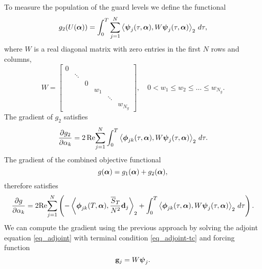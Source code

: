 \documentclass[11pt]{article}
\begin{document}
To measure the population of the guard levels we define the functional
\begin{equation}
  g_2(U(\boldsymbol{\alpha})) =\int_0^T \sum_{j=1}^N \left\langle \boldsymbol{\psi}_j(\tau,\boldsymbol{\alpha}), W\boldsymbol{\psi}_j(\tau,\boldsymbol{\alpha})
  \right\rangle_2\, d\tau,
\end{equation}
where $W$ is a real diagonal matrix with zero entries in the first $N$ rows and columns,
\[
W = \begin{bmatrix}
  0 &&&&& \\
  & \ddots &&&& \\
  && 0 &&& \\
  &&& w_1 && \\
  &&&& \ddots & \\
  &&&&& w_{N_g}
\end{bmatrix},\quad 0 < w_1 \leq w_2 \leq \ldots \leq w_{N_g}.
\]
The gradient of $g_2$ satisfies
\[
\frac{\partial g_2}{\partial \alpha_k} = 2\,{\rm Re}\! \sum_{j=1}^N  \int_0^T \left\langle \boldsymbol{\phi}_{jk}(\tau,\boldsymbol{\alpha}), W\boldsymbol{\psi}_j(\tau,\boldsymbol{\alpha})
\right\rangle_2\, d\tau.
\]
The gradient of the combined objective functional
\[
g(\boldsymbol{\alpha}) = g_1(\boldsymbol{\alpha}) + g_2(\boldsymbol{\alpha}),
\]
therefore satisfies
\[
\frac{\partial g}{\partial \alpha_k} = 2 {\rm Re}\! \sum_{j=1}^N \left(
%
-\left\langle\phib_{jk}(T,\alphab), \frac{\overline{S}_T}{N^2} \db_j \right\rangle_2 +
%
\int_0^T \left\langle \phib_{jk}(\tau,\alphab), W\psib_j(\tau,\alphab)\right\rangle_2\, d\tau \right).
\]
We can compute the gradient using the previous approach by solving the adjoint equation
\eqref{eq_adjoint} with terminal condition \eqref{eq_adjoint-tc} and forcing function
\[
{\mathbf g}_j = W \boldsymbol{\psi}_j.
\]
  
\end{document}
